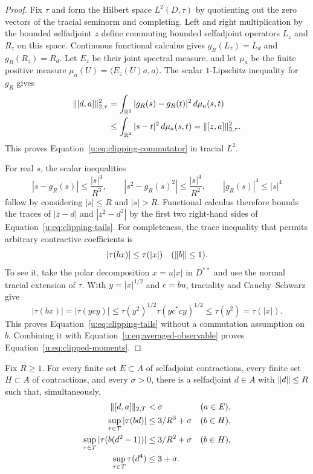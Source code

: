 \begin{proof}
Fix $\tau$ and form the Hilbert space $L^2(D,\tau)$ by quotienting out
the zero vectors of the tracial seminorm and completing.  Left and
right multiplication by the bounded selfadjoint $z$ define commuting
bounded selfadjoint operators $L_z$ and $R_z$ on this space.  Continuous
functional calculus gives $g_R(L_z)=L_d$ and $g_R(R_z)=R_d$.
Let $E_z$ be their joint spectral measure, and let $\mu_a$ be the finite
positive measure $\mu_a(U)=\langle E_z(U)a,a\rangle$.  The scalar
$1$-Lipschitz inequality for $g_R$ gives
\begin{align*}
 \lVert[d,a]\rVert_{2,\tau}^2
 &=\int_{\mathbb R^2}|g_R(s)-g_R(t)|^2\,d\mu_a(s,t)\\
 &\le\int_{\mathbb R^2}|s-t|^2\,d\mu_a(s,t)
  =\lVert[z,a]\rVert_{2,\tau}^2.
\end{align*}
This proves Equation~\eqref{u:eq:clipping-commutator} in tracial $L^2$.

For real $s$, the scalar inequalities
\[
 |s-g_R(s)|\le\frac{|s|^4}{R^3},\qquad
 |s^2-g_R(s)^2|\le\frac{|s|^4}{R^2},\qquad
 |g_R(s)|^4\le|s|^4
\]
follow by considering $|s|\le R$ and $|s|>R$.  Functional calculus
therefore bounds the traces of $|z-d|$ and $|z^2-d^2|$ by the first two
right-hand sides of Equation~\eqref{u:eq:clipping-tails}.
For completeness, the trace inequality that permits arbitrary
contractive coefficients is
\begin{equation}
 |\tau(bx)|\le\tau(|x|)\quad(\lVert b\rVert\le1).
 \label{u:eq:trace-coefficient-bound}
\end{equation}
To see it, take the polar decomposition $x=u|x|$ in $D^{**}$ and use the
normal tracial extension of $\tau$.  With $y=|x|^{1/2}$ and $c=bu$,
traciality and Cauchy--Schwarz give
\[
 |\tau(bx)|=|\tau(ycy)|
 \le\tau(y^2)^{1/2}\tau(yc^*cy)^{1/2}
 \le\tau(y^2)=\tau(|x|).
\]
This proves Equation~\eqref{u:eq:clipping-tails} without a commutation
assumption on $b$.  Combining it with
Equation~\eqref{u:eq:averaged-observable} proves
Equation~\eqref{u:eq:clipped-moments}.
\end{proof}

\begin{proposition}
\label{u:prop:local-moments}
Fix $R\ge1$.  For every finite set $E\subset A$ of selfadjoint
contractions, every finite set $H\subset A$ of contractions, and every
$\sigma>0$, there is a selfadjoint $d\in A$ with $\lVert d\rVert\le R$ such
that, simultaneously,
\begin{equation}
 \begin{aligned}
  \lVert[d,a]\rVert_{2,T}&<\sigma &&(a\in E),\\
  \sup_{\tau\in T}|\tau(bd)|&\le3/R^3+\sigma &&(b\in H),\\
  \sup_{\tau\in T}|\tau(b(d^2-1))|&\le3/R^2+\sigma &&(b\in H),\\
  \sup_{\tau\in T}\tau(d^4)&\le3+\sigma.
 \end{aligned}
 \label{u:eq:local-moments}
\end{equation}
\end{proposition}

